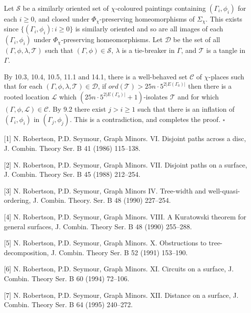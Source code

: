 Let $\mathscr{S}$ be a similarly oriented set of $\chi$-coloured paintings containing $(\Gamma_i, \phi_i)$ for each $i \ge 0$, and closed under $\Phi_\chi$-preserving homeomorphisms of $\Sigma_\chi$. This exists since $\{(\Gamma_i, \phi_i) \colon i \ge 0\}$ is similarly oriented and so are all images of each $(\Gamma_i, \phi_i)$ under $\Phi_\chi$-preserving homeomorphisms. Let $\mathscr{D}$ be the set of all $(\Gamma, \phi, \lambda, \mathscr{T})$ such that $(\Gamma, \phi) \in \mathscr{S}$, $\lambda$ is a tie-breaker in $\Gamma$, and $\mathscr{T}$ is a tangle in $\Gamma$.

By 10.3, 10.4, 10.5, 11.1 and 14.1, there is a well-behaved set $\mathscr{C}$ of $\chi$-places such that for each $(\Gamma, \phi, \lambda, \mathscr{T}) \in \mathscr{D}$, if $ord(\mathscr{T}) > 25n \cdot 5^{2|E(\Gamma_0)|}$ then there is a rooted location $\mathscr{L}$ which $(25n \cdot 5^{2|E(\Gamma_0)|} + 1)$-isolates $\mathscr{T}$ and for which $(\Gamma, \phi, \mathscr{L}) \in \mathscr{C}$. By 9.2 there exist $j > i \ge 1$ such that there is an inflation of $(\Gamma_i, \phi_i)$ in $(\Gamma_j, \phi_j)$. This is a contradiction, and completes the proof. $\square$


[1] N. Robertson, P.D. Seymour, Graph Minors. VI. Disjoint paths across a disc, J. Combin. Theory Ser. B 41 (1986) 115--138.

[2] N. Robertson, P.D. Seymour, Graph Minors. VII. Disjoint paths on a surface, J. Combin. Theory Ser. B 45 (1988) 212--254.

[3] N. Robertson, P.D. Seymour, Graph Minors IV. Tree-width and well-quasi-ordering, J. Combin. Theory. Ser. B 48 (1990) 227--254.

[4] N. Robertson, P.D. Seymour, Graph Minors. VIII. A Kuratowski theorem for general surfaces, J. Combin. Theory Ser. B 48 (1990) 255--288.

[5] N. Robertson, P.D. Seymour, Graph Minors. X. Obstructions to tree-decomposition, J. Combin. Theory Ser. B 52 (1991) 153--190.

[6] N. Robertson, P.D. Seymour, Graph Minors. XI. Circuits on a surface, J. Combin. Theory Ser. B 60 (1994) 72--106.

[7] N. Robertson, P.D. Seymour, Graph Minors. XII. Distance on a surface, J. Combin. Theory Ser. B 64 (1995) 240--272.
